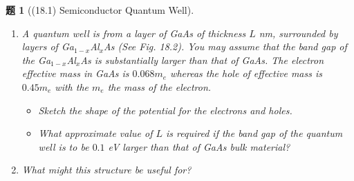 \documentclass[UTF8,10pt,a4paper]{article}
\theoremstyle{Problem}
\newtheorem{prob}{题}
\theoremstyle{Solution}
\begin{document}
\thispagestyle{FirstPageStyle}
\begin{prob}[(18.1) Semiconductor Quantum Well]
    \begin{enumerate}
        \item[(a)] A quantum well is from a layer of GaAs of thickness $L$ nm, surrounded by layers of Ga$_{1-x}$Al$_x$As (See Fig. 18.2). You may assume that the band gap of the Ga$_{1-x}$Al$_x$As is substantially larger than that of GaAs. The electron effective mass in GaAs is $0.068m_e$ whereas the hole of effective mass is $0.45m_e$ with the $m_e$ the mass of the electron.
        \begin{itemize}
            \item[$\triangleright$] Sketch the shape of the potential for the electrons and holes.
            \item[$\triangleright$] What approximate value of $L$ is required if the band gap of the quantum well is to be $0.1$ eV larger than that of GaAs bulk material?
        \end{itemize}
        \item[(b)$^*$] What might this structure be useful for?
    \end{enumerate}
\end{prob}
\end{document}
